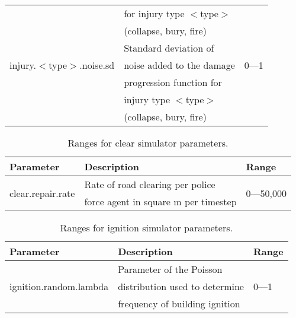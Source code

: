 \documentclass{article}
\begin{document}
\begin{table}[htb]
\begin{tabular}{lll}
                                                            & for injury type
  $<$type$>$                            & \\
                                                            & (collapse, bury,
  fire)                                 & \\
  \hline
  \multirow{3}{*}{injury.$<$type$>$.noise.sd}               & Standard deviation
  of                                    & \multirow{3}{*}{0---1}\\
                                                            & noise added to the
  damage                                & \\
                                                            & progression
  function for                          & \\
                                                            & injury type
  $<$type$>$                            & \\
                                                            & (collapse, bury,
  fire)                                 & \\
  \hline
\end{tabular}
\end{table}

\begin{table}[htb]
\caption{Ranges for clear simulator parameters.}
\label{tab:14}
\centering
\begin{tabular}{lll}
  \hline
  \textbf{Parameter}                  & \textbf{Description}                  &
  \textbf{Range}\\
  \hline
  \multirow{2}{*}{clear.repair.rate}  & Rate of road clearing per police      &
  \multirow{2}{*}{0---50,000}\\
                                      & force agent in square m per timestep  &
  \\
  \hline
\end{tabular}
\end{table}

\begin{table}[htb]
\caption{Ranges for ignition simulator parameters.}
\label{tab:15}
\centering
\begin{tabular}{lll}
  \hline
  \textbf{Parameter}                      & \textbf{Description}            &
  \textbf{Range}\\
  \hline
  \multirow{3}{*}{ignition.random.lambda} & Parameter of the Poisson        &
  \multirow{3}{*}{0---1}\\
                                          & distribution used to determine  & \\
                                          & frequency of building ignition  & \\
  \hline
\end{tabular}
\end{table}
\end{document}
